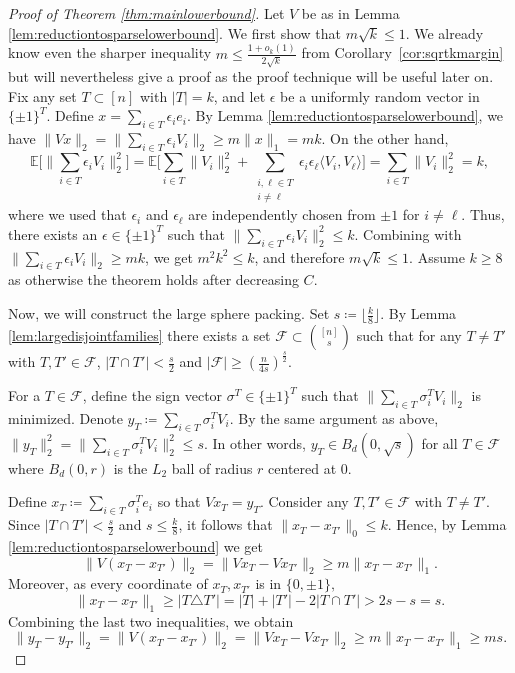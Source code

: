 \documentclass[preprint]{article}
\newcommand{\expect}{\mathbb{E}}
\begin{document}
\begin{proof}[Proof of Theorem \ref{thm:mainlowerbound}]
    Let $V$ be as in Lemma \ref{lem:reductiontosparselowerbound}. We first show that $m \sqrt{k} \leq 1.$ We already know even the sharper inequality $m\le \frac{1+o_k(1)}{2\sqrt{k}}$ 
    from Corollary~\ref{cor:sqrtkmargin} but will nevertheless give a proof as the proof technique will be useful later on.
    Fix any set $T \subset [n]$ with $|T|=k$, and let $\epsilon$ be a uniformly random vector in  $\{\pm 1\}^T.$ Define $x = \sum_{i \in T}\epsilon_i e_i$. By Lemma \ref{lem:reductiontosparselowerbound}, we have
$\|Vx\|_2 = \|\sum_{i \in T}\epsilon_i V_i\|_2 \geq m\|x\|_1 = mk.$
On the other hand, 
$$
\expect
\Big[\|\sum_{i \in T}\epsilon_i V_i\|_2^2
\Big] = 
\expect
\Big[
\sum_{i \in T}\|V_i\|_2^2 + \sum_{\substack{i,\ell \in T\\ i\neq \ell}}\epsilon_i\epsilon_\ell \langle V_i,V_\ell\rangle
\Big]
= \sum_{i \in T}\|V_i\|_2^2  = k,$$
where we used that $\epsilon_i$ and $\epsilon_\ell$ are independently chosen from $\pm 1$ for $i \neq \ell$. Thus, there exists an $\epsilon \in \{\pm1\}^T$ such that $\|\sum_{i \in T}\epsilon_iV_i\|_2^2\le k$. Combining with $\|\sum_{i \in T}\epsilon_iV_i\|_2\ge mk$, we get $m^2k^2\le k$, and therefore $m\sqrt{k}\le 1$. Assume $k \geq 8$ as otherwise the theorem holds after decreasing $C$.

Now, we will construct the large sphere packing. Set $s\coloneqq \lfloor \frac{k}{8}\rfloor$. By Lemma \ref{lem:largedisjointfamilies} there exists a set $\mathcal{F} \subset \binom{[n]}{s}$ such that for any $T \neq T'$ with $T, T' \in \mathcal{F}$, $|T\cap T'| < \frac{s}{2}$ and $|\mathcal{F}| \geq  (\frac{n}{4s}  )^\frac{s}{2}$. 

For a $T \in \mathcal{F}$, define the sign vector $\sigma^T \in \{\pm 1\}^T$ such that $ \|\sum_{i \in T} \sigma_i^T V_i  \|_2$ is minimized. Denote $y_T \coloneqq \sum_{i \in T} \sigma_i^T V_i.$
By the same argument as above, $\|y_T\|_2^2 = \|\sum_{i \in T} \sigma_i^T V_i\|^2_2\le s.$  In other words, $y_T \in B_d(0,\sqrt{s})$ for all $T \in \mathcal{F}$ where $B_d(0,r)$ is the $L_2$ ball of radius $r$ centered at 0.

Define $x_T\coloneqq\sum_{i \in T}\sigma_i^T e_i$ so that $Vx_T = y_T$. Consider any $T, T' \in \mathcal{F}$ with $T \neq T'$. Since $|T \cap T'| < \frac{s}{2}$ and $s \leq \frac{k}{8}$, it follows that $\|x_{T} - x_{T'}\|_0 \leq k$. Hence, by Lemma \ref{lem:reductiontosparselowerbound} we get 
$$\|V(x_T - x_{T'})\|_2 = \|Vx_T - Vx_{T'}\|_2 \geq m\|x_T - x_{T'}\|_1.$$
Moreover, as every coordinate of $x_T, x_{T'}$ is in $\{0, \pm 1\},$
$$\|x_T-x_{T'}\|_1 \ge |T\triangle T'| = |T|+|T'|-2|T\cap T'| > 2s-s = s.$$
Combining the last two inequalities, we obtain 
$$
\|y_T - y_{T'}\|_2 = 
\|V(x_T - x_{T'})\|_2 = \|Vx_T - Vx_{T'}\|_2 \geq m\|x_T - x_{T'}\|_1 \geq ms.$$


\end{proof}
\end{document}
